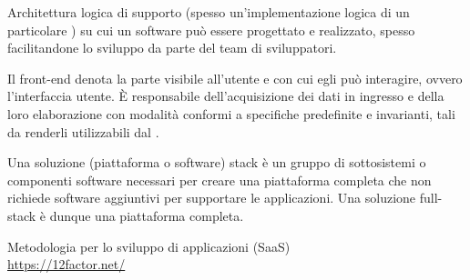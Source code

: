 Architettura logica di supporto (spesso un'implementazione logica di un particolare ) su cui un software può essere progettato e realizzato, spesso facilitandone lo sviluppo da parte del team di sviluppatori.

Il front-end denota la parte visibile all’utente e con cui egli può interagire, ovvero l’interfaccia utente. \`{E} responsabile dell’acquisizione dei dati in ingresso e della loro elaborazione con modalità conformi a specifiche predefinite e invarianti, tali da renderli utilizzabili dal .

Una soluzione (piattaforma o software) stack è un gruppo di sottosistemi o componenti software necessari per creare una piattaforma completa che non richiede software aggiuntivi per supportare le applicazioni. Una soluzione full-stack è dunque una piattaforma completa.	

Metodologia per lo sviluppo di applicazioni  (SaaS)\\
\url{https://12factor.net/}
\clearpage